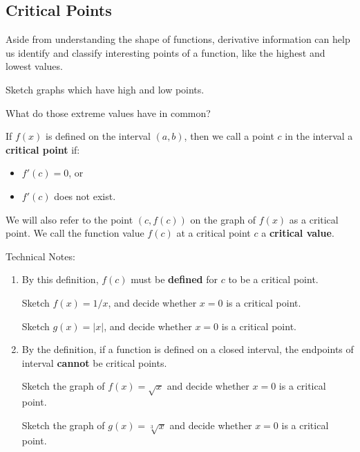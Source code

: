 \newpage
{}

\subsection*{Critical Points} 

Aside from understanding the shape of functions, derivative
information can help us identify and classify interesting points of a
function, like the highest and lowest values.

\problem Sketch graphs which have high and low points.  

\vfill 

What do those extreme values have in common?


\newpage

\begin{boxnote}

  If $f(x)$ is defined on the interval $(a,b)$, then we call a point
  $c$ in the interval a {\bf critical point} if:
\begin{itemize}
	\item $f'(c) = 0$, or
	\item $f'(c)$ does not exist.
\end{itemize}
We will also refer to the point $(c,f(c))$ on the graph of $f(x)$ as a
critical point.  We call the function value $f(c)$ at a critical point
$c$ a {\bf critical value}.

\vsc
\end{boxnote}

\newpage

Technical Notes:
\begin{enumerate} 
\item By this definition, $f(c)$ must be {\bf defined} for
  $c$ to be a critical point.  

\problem   Sketch $f(x) = 1/x$, and decide whether $x=0$ is a
    critical point.

\vfill
  Sketch $g(x) = |x|$, and decide whether $x=0$ is a
    critical point.

\vfill

\newpage

\item By the definition, if a function is defined on a closed
  interval, the endpoints of interval {\bf cannot} be critical points.

\problem   Sketch the graph of $f(x) = \sqrt{x}$ and decide
    whether $x=0$ is a critical point.

\vfill

\newpage

\problem Sketch the graph of $g(x) = \sqrt[3]{x}$ and decide
  whether $x=0$ is a critical point.

\vfill

\end{enumerate}


